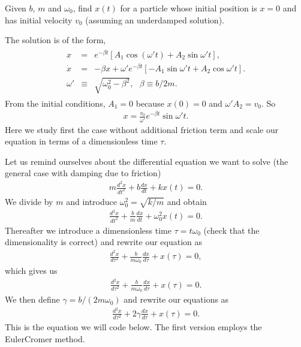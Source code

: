 \documentclass[letterpaper,10pt,english]{sphinxmanual}
\begin{document}
Given \(b\), \(m\) and \(\omega_0\), find \(x(t)\) for a particle whose
initial position is \(x=0\) and has initial velocity \(v_0\) (assuming an
underdamped solution).

The solution is of the form,
\begin{equation*}
\begin{split}
\begin{eqnarray*}
x&=&e^{-\beta t}\left[A_1\cos(\omega' t)+A_2\sin\omega't\right],\\
\dot{x}&=&-\beta x+\omega'e^{-\beta t}\left[-A_1\sin\omega't+A_2\cos\omega't\right].\\
\omega'&\equiv&\sqrt{\omega_0^2-\beta^2},~~~\beta\equiv b/2m.
\end{eqnarray*}
\end{split}
\end{equation*}
From the initial conditions, \(A_1=0\) because \(x(0)=0\) and \(\omega'A_2=v_0\). So
\begin{equation*}
\begin{split}
x=\frac{v_0}{\omega'}e^{-\beta t}\sin\omega't.
\end{split}
\end{equation*}
Here we study first the case without additional friction term and scale our equation
in terms of a dimensionless time \(\tau\).

Let us remind ourselves about the differential equation we want to solve (the general case with damping due to friction)
\begin{equation*}
\begin{split}
m\frac{d^2x}{dt^2} + b\frac{dx}{dt}+kx(t) =0.
\end{split}
\end{equation*}
We divide by \(m\) and introduce \(\omega_0^2=\sqrt{k/m}\) and obtain
\begin{equation*}
\begin{split}
\frac{d^2x}{dt^2} + \frac{b}{m}\frac{dx}{dt}+\omega_0^2x(t) =0.
\end{split}
\end{equation*}
Thereafter we introduce a dimensionless time \(\tau = t\omega_0\) (check
that the dimensionality is correct) and rewrite our equation as
\begin{equation*}
\begin{split}
\frac{d^2x}{d\tau^2} + \frac{b}{m\omega_0}\frac{dx}{d\tau}+x(\tau) =0,
\end{split}
\end{equation*}
which gives us
\begin{equation*}
\begin{split}
\frac{d^2x}{d\tau^2} + \frac{b}{m\omega_0}\frac{dx}{d\tau}+x(\tau) =0.
\end{split}
\end{equation*}
We then define \(\gamma = b/(2m\omega_0)\) and rewrite our equations as
\begin{equation*}
\begin{split}
\frac{d^2x}{d\tau^2} + 2\gamma\frac{dx}{d\tau}+x(\tau) =0.
\end{split}
\end{equation*}
This is the equation we will code below. The first version employs the Euler\sphinxhyphen{}Cromer method.
\end{document}
